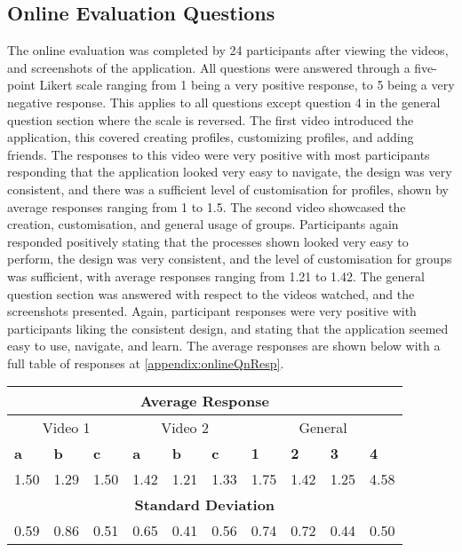 \subsection{Online Evaluation Questions}

The online evaluation was completed by 24 participants after viewing the videos, and screenshots of the application. All questions were answered through a five-point Likert scale ranging from 1 being a very positive response, to 5 being a very negative response. This applies to all questions except question 4 in the general question section where the scale is reversed. The first video introduced the application, this covered creating profiles, customizing profiles, and adding friends. The responses to this video were very positive with most participants responding that the application looked very easy to navigate, the design was very consistent, and there was a sufficient level of customisation for profiles, shown by average responses ranging from 1 to 1.5. The second video showcased the creation, customisation, and general usage of groups. Participants again responded positively stating that the processes shown looked very easy to perform, the design was very consistent, and the level of customisation for groups was sufficient, with average responses ranging from 1.21 to 1.42. The general question section was answered with respect to the videos watched, and the screenshots presented. Again, participant responses were very positive with participants liking the consistent design, and stating that the application seemed easy to use, navigate, and learn. The average responses are shown below with a full table of responses at \ref{appendix:onlineQnResp}.

\begin{table}[!ht]
    \centering
    \begin{tabular}{|l|l|l||l|l|l||l|l|l|l|}
    \hline
    \multicolumn{10}{|c|}{\textbf{Average Response }} \\
    \hline
     \multicolumn{3}{|c||}{Video 1 } &
     \multicolumn{3}{|c||}{Video 2 } &
     \multicolumn{4}{|c|}{General } \\
    \hline
        \textbf{a} & \textbf{b} & \textbf{c} & \textbf{a} & \textbf{b} & \textbf{c} & \textbf{1} & \textbf{2} & \textbf{3} & \textbf{4} \\ \hline
    \hline
        1.50 & 1.29 & 1.50 & 1.42 & 1.21 & 1.33 & 1.75 & 1.42 & 1.25 & 4.58 \\ \hline
        \multicolumn{10}{|c|}{\textbf{Standard Deviation }} \\ \hline
        0.59 & 0.86 & 0.51 & 0.65 & 0.41 & 0.56 & 0.74 & 0.72 & 0.44 & 0.50 \\ \hline
    \end{tabular}
\end{table}

